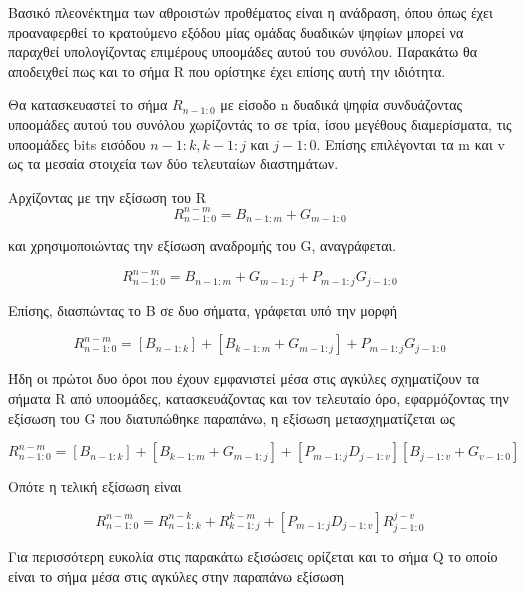 Βασικό πλεονέκτημα των αθροιστών προθέματος είναι η ανάδραση, όπου όπως 
έχει προαναφερθεί το κρατούμενο εξόδου μίας ομάδας δυαδικών ψηφίων μπορεί
να παραχθεί υπολογίζοντας επιμέρους υποομάδες αυτού του συνόλου.
Παρακάτω θα αποδειχθεί πως και το σήμα R που ορίστηκε έχει 
επίσης αυτή την ιδιότητα.

Θα κατασκευαστεί το σήμα $R_{n-1:0}$ με είσοδο n δυαδικά ψηφία συνδυάζοντας
υποομάδες αυτού του συνόλου χωρίζοντάς το σε τρία, ίσου μεγέθους διαμερίσματα, τις υποομάδες bits εισόδου $n-1:k , k-1:j$ και $j-1:0$. Επίσης επιλέγονται τα m και v ως τα μεσαία στοιχεία των δύο τελευταίων διαστημάτων.
 

Αρχίζοντας με την εξίσωση του R %
\begin{equation*}
    R^{n-m}_{n-1:0} = B_{n-1:m} + G_{m-1:0}
\end{equation*}

και χρησιμοποιώντας την εξίσωση αναδρομής του G, αναγράφεται.

\begin{equation*}
    R^{n-m}_{n-1:0} = B_{n-1:m} + G_{m-1:j} + P_{m-1:j}G_{j-1:0}
\end{equation*}

Επίσης, διασπώντας το B σε δυο σήματα, γράφεται υπό την μορφή

\begin{equation*}
    R^{n-m}_{n-1:0} = [ B_{n-1:k} ] + [ B_{k-1:m} + G_{m-1:j} ] + P_{m-1:j}G_{j-1:0}
\end{equation*}

Ήδη οι πρώτοι δυο όροι που έχουν εμφανιστεί μέσα στις αγκύλες σχηματίζουν τα 
σήματα R από υποομάδες, κατασκευάζοντας και τον τελευταίο όρο, εφαρμόζοντας την
εξίσωση του G που διατυπώθηκε παραπάνω, η εξίσωση μετασχηματίζεται ως

\begin{equation*}
    R^{n-m}_{n-1:0} = [ B_{n-1:k} ] + [ B_{k-1:m} + G_{m-1:j} ] + [ P_{m-1:j}D_{j-1:v} ][B_{j-1:v}+G_{v-1:0}]
\end{equation*}

Οπότε η τελική εξίσωση είναι 

\begin{equation}
    R^{n-m}_{n-1:0} = R^{n-k}_{n-1:k} + R^{k-m}_{k-1:j} + [ P_{m-1:j}D_{j-1:v} ]R^{j-v}_{j-1:0}
\end{equation}

Για περισσότερη ευκολία στις παρακάτω εξισώσεις ορίζεται και το σήμα Q 
το οποίο είναι το σήμα μέσα στις αγκύλες στην παραπάνω εξίσωση  

